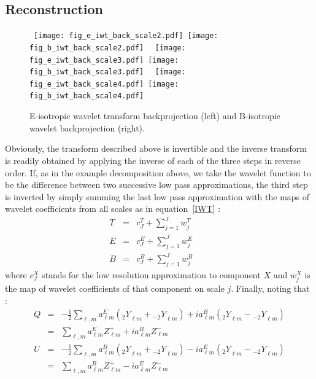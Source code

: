 \subsection*{Reconstruction}
\begin{figure*}[htb]
\centerline{
\vbox{
 \hbox{
 \texttt{[image: fig\_e\_iwt\_back\_scale2.pdf]}
 \texttt{[image: fig\_b\_iwt\_back\_scale2.pdf]}
 }
  \hbox{
 \texttt{[image: fig\_e\_iwt\_back\_scale3.pdf]}
 \texttt{[image: fig\_b\_iwt\_back\_scale3.pdf]}
 }
 \hbox{
 \texttt{[image: fig\_e\_iwt\_back\_scale4.pdf]}
 \texttt{[image: fig\_b\_iwt\_back\_scale4.pdf]}
 }
 }
 }
\caption{E-isotropic wavelet transform backprojection (left) and B-isotropic wavelet backprojection (right).}
\label{fig_eb_iwt_back}
\end{figure*}
Obviously, the transform described above is invertible and the inverse transform is readily obtained by applying the inverse 
of each of the three steps in reverse order. If, as in the example decomposition above, we take the wavelet function to be 
the difference between two successive low pass approximations, the third step is inverted by simply summing the last low pass 
approximation with the maps of wavelet coefficients from all scales as in equation~\ref{IWT} : 
\begin{eqnarray}
T  & = & c_{J}^T + \sum_{j=1}^{J} w_j^T \quad \quad \nonumber \\
E & = & c_{J}^E + \sum_{j=1}^{J} w_j^E \quad \quad \nonumber \\
B & = &  c_{J}^B + \sum_{j=1}^{J} w_j^B
\end{eqnarray}
where $c_{J}^X$ stands for the low resolution approximation to component $X$ and $w_j^X$ is the map of wavelet coefficients of that component on scale $j$. Finally, noting that : 
\begin{eqnarray}
Q  & =  & -\frac{1}{2} \sum_{\ell, m}   a_{\ell m} ^E   ( {_{ 2} Y}_{\ell m} +  {_{ -2} Y}_{\ell m} ) +  i a_{\ell m} ^B ( {_{ 2} Y}_{\ell m} -  {_{ -2} Y}_{\ell m} )  \nonumber \\
     & =  & \sum_{\ell, m}   a_{\ell m} ^E   Z_{\ell m}^+ +  i a_{\ell m} ^B Z_{\ell m}^-   \\ \nonumber
U  & =   & -\frac{1}{2} \sum_{\ell, m}   a_{\ell m} ^B   ( {_{ 2} Y}_{\ell m} +  {_{ -2} Y}_{\ell m} ) -  i a_{\ell m} ^E ( {_{ 2} Y}_{\ell m} -  {_{ -2} Y}_{\ell m} )  \nonumber \\
      & =  & \sum_{\ell, m}   a_{\ell m} ^B Z_{\ell m}^+ -  i a_{\ell m} ^E Z_{\ell m}^-   
\end{eqnarray}
